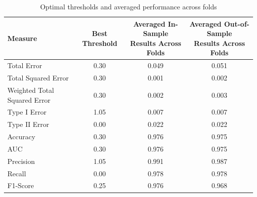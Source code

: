\documentclass[a4paper,12pt]{article}
\begin{document}
\begin{table}[!htb]
\centering
\small
\renewcommand{\arraystretch}{1.2}
\begin{threeparttable}
\begin{subtable}[t]{\textwidth}
\centering
\caption{Optimal thresholds and averaged performance across folds}
\label{tab-gt-justification}
\begin{tabular}{lccc}
\hline
Measure  & Best Threshold  & \makecell{Averaged In-Sample \\ Results Across Folds} & \makecell{Averaged Out-of-Sample \\ Results Across Folds} \\
\midrule
Total Error                    & 0.30 & 0.049 & 0.051 \\
Total Squared Error           & 0.30 & 0.001 & 0.002 \\
Weighted Total Squared Error  & 0.30 & 0.002 & 0.003 \\
Type I Error                  & 1.05 & 0.007 & 0.007 \\
Type II Error                 & 0.00 & 0.022 & 0.022 \\
Accuracy                      & 0.30 & 0.976 & 0.975 \\
AUC                           & 0.30 & 0.976 & 0.975 \\
Precision                     & 1.05 & 0.991 & 0.987 \\
Recall                        & 0.00 & 0.978 & 0.978 \\
F1-Score                      & 0.25 & 0.976 & 0.968 \\
\hline
\end{tabular}
\end{subtable}

\vspace{0.6em}


\end{threeparttable}
\end{table}
\end{document}
